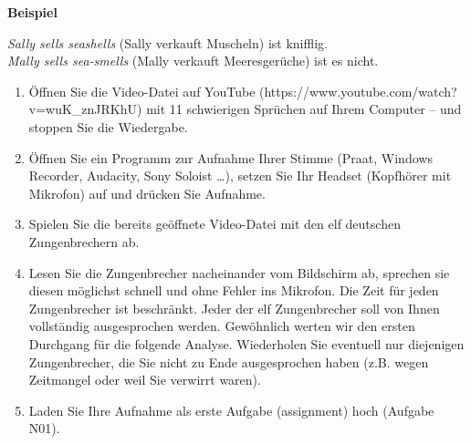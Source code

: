\documentclass[
  letterpaper,
]{scrbook}
\providecommand{\tightlist}{%
  \setlength{\itemsep}{0pt}\setlength{\parskip}{0pt}}\usepackage{longtable,booktabs,array}
\begin{document}
\begin{tcolorbox}[enhanced jigsaw, colframe=quarto-callout-note-color-frame, toprule=.15mm, breakable, leftrule=.75mm, rightrule=.15mm, arc=.35mm, colback=white, left=2mm, bottomrule=.15mm, opacityback=0]
\begin{minipage}[t]{5.5mm}
\textcolor{quarto-callout-note-color}{\faInfo}
\end{minipage}%
\begin{minipage}[t]{\textwidth - 5.5mm}

\textbf{Beispiel}\vspace{2mm}

\emph{Sally sells seashells} (Sally verkauft Muscheln) ist knifflig.\\
\emph{Mally sells sea-smells} (Mally verkauft Meeresgerüche) ist es
nicht.

\end{minipage}%
\end{tcolorbox}

\begin{enumerate}
\def\labelenumi{\arabic{enumi}.}
\tightlist
\item
  Öffnen Sie die Video-Datei auf YouTube
  (https://www.youtube.com/watch?v=wuK\_znJRKhU) mit 11 schwierigen
  Sprüchen auf Ihrem Computer -- und stoppen Sie die Wiedergabe.\\
\item
  Öffnen Sie ein Programm zur Aufnahme Ihrer Stimme (Praat, Windows
  Recorder, Audacity, Sony Soloist \ldots), setzen Sie Ihr Headset
  (Kopfhörer mit Mikrofon) auf und drücken Sie Aufnahme.\\
\item
  Spielen Sie die bereits geöffnete Video-Datei mit den elf deutschen
  Zungenbrechern ab.\\
\item
  Lesen Sie die Zungenbrecher nacheinander vom Bildschirm ab, sprechen
  sie diesen möglichst schnell und ohne Fehler ins Mikrofon. Die Zeit
  für jeden Zungenbrecher ist beschränkt. Jeder der elf Zungenbrecher
  soll von Ihnen vollständig ausgesprochen werden. Gewöhnlich werten wir
  den ersten Durchgang für die folgende Analyse. Wiederholen Sie
  eventuell nur diejenigen Zungenbrecher, die Sie nicht zu Ende
  ausgesprochen haben (z.B. wegen Zeitmangel oder weil Sie verwirrt
  waren).\\
\item
  Laden Sie Ihre Aufnahme als erste Aufgabe (assignment) hoch (Aufgabe
  N01).\\
\end{enumerate}
\end{document}
